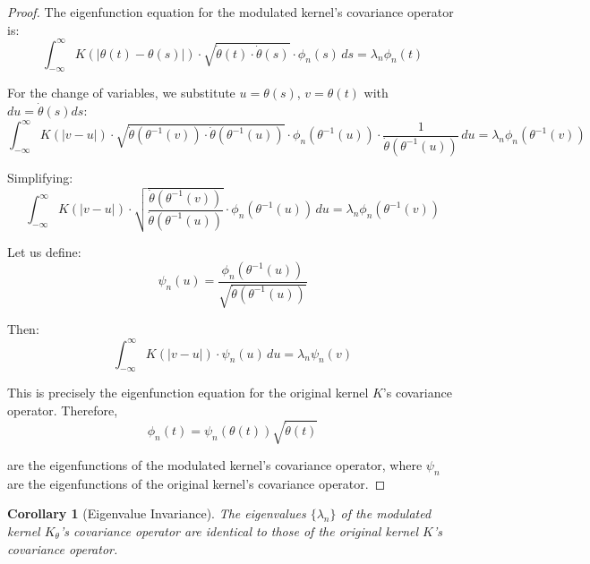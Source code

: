 \documentclass{article}
\newtheorem{corollary}[theorem]{Corollary}
\newcommand{\dottheta}{\dot{\theta}}
\begin{document}
\begin{proof}
The eigenfunction equation for the modulated kernel's covariance operator is:
\begin{equation}
\int_{-\infty}^{\infty} K(|\theta(t)-\theta(s)|) \cdot \sqrt{\dottheta(t) \cdot \dottheta(s)} \cdot \phi_n(s) \, ds = \lambda_n \phi_n(t)
\end{equation}

For the change of variables, we substitute $u=\theta(s)$, $v=\theta(t)$ with $du = \dottheta(s)ds$:
\begin{equation}
\int_{-\infty}^{\infty} K(|v-u|) \cdot \sqrt{\dottheta(\theta^{-1}(v)) \cdot \dottheta(\theta^{-1}(u))} \cdot \phi_n(\theta^{-1}(u)) \cdot \frac{1}{\dottheta(\theta^{-1}(u))} \, du = \lambda_n \phi_n(\theta^{-1}(v))
\end{equation}

Simplifying:
\begin{equation}
\int_{-\infty}^{\infty} K(|v-u|) \cdot \sqrt{\frac{\dottheta(\theta^{-1}(v))}{\dottheta(\theta^{-1}(u))}} \cdot \phi_n(\theta^{-1}(u)) \, du = \lambda_n \phi_n(\theta^{-1}(v))
\end{equation}

Let us define:
\begin{equation}
\psi_n(u) = \frac{\phi_n(\theta^{-1}(u))}{\sqrt{\dottheta(\theta^{-1}(u))}}
\end{equation}

Then:
\begin{equation}
\int_{-\infty}^{\infty} K(|v-u|) \cdot \psi_n(u) \, du = \lambda_n \psi_n(v)
\end{equation}

This is precisely the eigenfunction equation for the original kernel $K$'s covariance operator. Therefore,
\begin{equation}
\phi_n(t) = \psi_n(\theta(t))\sqrt{\dottheta(t)}
\end{equation}

are the eigenfunctions of the modulated kernel's covariance operator, where $\psi_n$ are the eigenfunctions of the original kernel's covariance operator.
\end{proof}

\begin{corollary}[Eigenvalue Invariance]
The eigenvalues $\{\lambda_n\}$ of the modulated kernel $K_\theta$'s covariance operator are identical to those of the original kernel $K$'s covariance operator.
\end{corollary}
\end{document}
